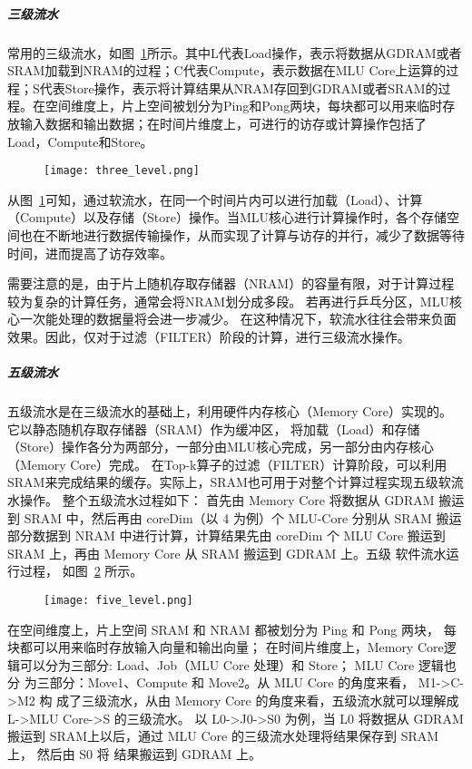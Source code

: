 \subparagraph{三级流水}
常用的三级流水，如图~\ref{fig:three_level}所示。其中L代表Load操作，表示将数据从GDRAM或者SRAM加载到NRAM的过程；C代表Compute，表示数据在MLU Core上运算的过程；S代表Store操作，表示将计算结果从NRAM存回到GDRAM或者SRAM的过程。在空间维度上，片上空间被划分为Ping和Pong两块，每块都可以用来临时存放输入数据和输出数据；在时间片维度上，可进行的访存或计算操作包括了Load，Compute和Store。
\begin{figure}[ht]
    \centering
    \texttt{[image: three\_level.png]}
    \caption{}
    \label{fig:three_level}
\end{figure}
从图~\ref{fig:three_level}可知，通过软流水，在同一个时间片内可以进行加载（Load）、计算（Compute）以及存储（Store）操作。当MLU核心进行计算操作时，各个存储空间也在不断地进行数据传输操作，从而实现了计算与访存的并行，减少了数据等待时间，进而提高了访存效率。

需要注意的是，由于片上随机存取存储器（NRAM）的容量有限，对于计算过程较为复杂的计算任务，通常会将NRAM划分成多段。
若再进行乒乓分区，MLU核心一次能处理的数据量将会进一步减少。
在这种情况下，软流水往往会带来负面效果。因此，仅对于过滤（FILTER）阶段的计算，进行三级流水操作。


\subparagraph{五级流水}

五级流水是在三级流水的基础上，利用硬件内存核心（Memory Core）实现的。它以静态随机存取存储器（SRAM）作为缓冲区，
将加载（Load）和存储（Store）操作各分为两部分，一部分由MLU核心完成，另一部分由内存核心（Memory Core）完成。
在Top-k算子的过滤（FILTER）计算阶段，可以利用SRAM来完成结果的缓存。实际上，SRAM也可用于对整个计算过程实现五级软流水操作。
整个五级流水过程如下：
首先由 Memory Core 将数据从 GDRAM 搬运到 SRAM 中，然后再由 coreDim（以 4 为例）个 MLU-Core 分别从 
SRAM 搬运部分数据到 NRAM 中进行计算，计算结果先由 coreDim 个 MLU Core 搬运到 SRAM 上，再由 Memory Core 从 
SRAM 搬运到 GDRAM 上。五级 软件流水运行过程，
如图~\ref{fig:five_level} 所示。
\begin{figure}[ht]
    \centering
    \texttt{[image: five\_level.png]}
    \caption{}
    \label{fig:five_level}
\end{figure}
在空间维度上，片上空间 SRAM 和 NRAM 都被划分为 Ping 和 Pong 两块， 每块都可以用来临时存放输入向量和输出向量；
在时间片维度上，Memory Core逻辑可以分为三部分: Load、Job（MLU Core 处理）和 Store；
MLU Core 逻辑也分 为三部分：Move1、Compute 和 Move2。从 MLU Core 的角度来看，
M1->C->M2 构 成了三级流水，从由 Memory Core 的角度来看，五级流水就可以理解成 L->MLU Core->S 的三级流水。
以 L0->J0->S0 为例，当 L0 将数据从 GDRAM 搬运到 SRAM上以后，通过 MLU Core 的三级流水处理将结果保存到 SRAM 上，
然后由 S0 将 结果搬运到 GDRAM 上。






